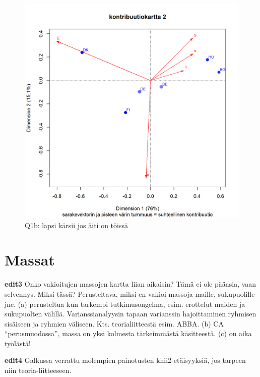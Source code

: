 \documentclass[
  finnish,
]{book}
\begin{document}
\begin{figure}

{\centering \includegraphics[width=0.9\linewidth]{JH_capaper_files/figure-latex/G1-3asymmContrib2-1} 

}

\caption{Q1b: lapsi kärsii jos äiti on töissä}\label{fig:G1-3asymmContrib2}
\end{figure}

\hypertarget{massat}{%
\section{Massat}\label{massat}}

\textbf{edit3} Onko vakioitujen massojen kartta liian aikaisin? Tämä ei ole pääasia, vaan selvennys.
Miksi tässä? Perusteltava, miksi en vakioi massoja maille, sukupuolille jne. (a)
perusteltua kun tarkempi tutkimusongelma, esim. erottelut maiden ja sukupuolten
välillä. Varianssianalyysin tapaan varianssin hajoittaminen ryhmisen sisäiseen ja
ryhmien väliseen. Kts. teorialiitteestä esim. ABBA. (b) CA ``perusmuodossa'', massa
on yksi kolmesta tärkeimmästä käsitteestä. (c) on aika työlästä!

\textbf{edit4} Galkussa verrattu molempien painotusten khii2-etäisyyksiä, jos tarpeen
niin teoria-liitteeseen.
\end{document}

